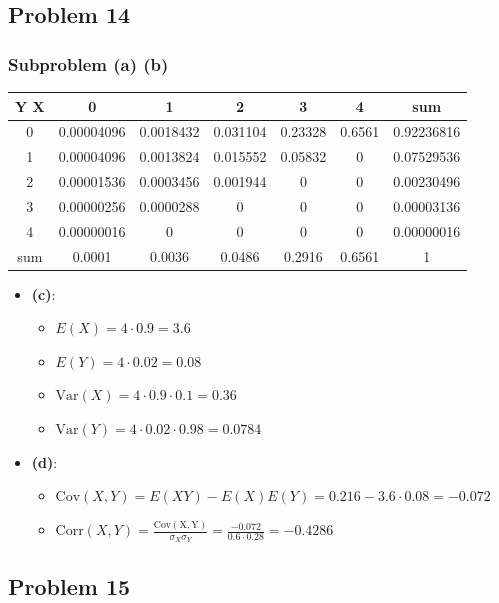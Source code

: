\documentclass{article}
\begin{document}
\subsection*{Problem 14}

\subsubsection*{Subproblem (a) (b)}

\begin{center}
\begin{tabular}{c|ccccc|c}
	Y X & 0 & 1 & 2 & 3 & 4 & sum\\
	\hline
	0 & 0.00004096 & 0.0018432 & 0.031104 & 0.23328 & 0.6561 & 0.92236816 \\
	1 & 0.00004096 & 0.0013824 & 0.015552 & 0.05832 & 0 & 0.07529536 \\
	2 & 0.00001536 & 0.0003456 & 0.001944 & 0 & 0 & 0.00230496 \\
	3 & 0.00000256 & 0.0000288 & 0 & 0 & 0 & 0.00003136 \\
	4 & 0.00000016 & 0 & 0 & 0 & 0 & 0.00000016 \\
	\hline
	sum & 0.0001 & 0.0036 & 0.0486 & 0.2916 & 0.6561 & 1
\end{tabular}
\end{center}

\begin{itemize}
	\item \textbf{(c)}:
		\begin{itemize}
			\item $E(X) = 4 \cdot 0.9 = 3.6$
			\item $E(Y) = 4 \cdot 0.02 = 0.08$
			\item $\mathrm{Var}(X) = 4 \cdot 0.9 \cdot 0.1 = 0.36$
			\item $\mathrm{Var}(Y) = 4 \cdot 0.02 \cdot 0.98 = 0.0784$
		\end{itemize}
	\item \textbf{(d)}:
		\begin{itemize}
			\item $\mathrm{Cov}(X, Y) = E(XY) - E(X)E(Y) =
				0.216 - 3.6 \cdot 0.08 = -0.072$
			\item $\mathrm{Corr}(X, Y) = \frac{\mathrm{Cov(X, Y)}}{\sigma_X \sigma_Y} =
				\frac{-0.072}{0.6 \cdot 0.28} = -0.4286$
		\end{itemize}
\end{itemize}

\subsection*{Problem 15}
\end{document}
